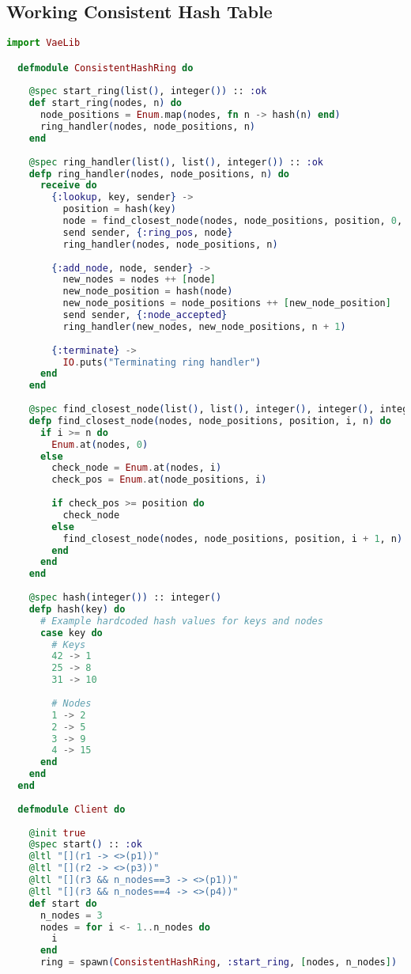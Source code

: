 \subsection{Working Consistent Hash Table}
\begin{lstlisting}[language=Elixir, xleftmargin=.1\linewidth]
  import VaeLib

  defmodule ConsistentHashRing do
  
    @spec start_ring(list(), integer()) :: :ok
    def start_ring(nodes, n) do
      node_positions = Enum.map(nodes, fn n -> hash(n) end)
      ring_handler(nodes, node_positions, n)
    end
  
    @spec ring_handler(list(), list(), integer()) :: :ok
    defp ring_handler(nodes, node_positions, n) do
      receive do
        {:lookup, key, sender} ->
          position = hash(key)
          node = find_closest_node(nodes, node_positions, position, 0, n)
          send sender, {:ring_pos, node}
          ring_handler(nodes, node_positions, n)
  
        {:add_node, node, sender} ->
          new_nodes = nodes ++ [node]
          new_node_position = hash(node)
          new_node_positions = node_positions ++ [new_node_position]
          send sender, {:node_accepted}
          ring_handler(new_nodes, new_node_positions, n + 1)
  
        {:terminate} ->
          IO.puts("Terminating ring handler")
      end
    end
  
    @spec find_closest_node(list(), list(), integer(), integer(), integer()) :: integer()
    defp find_closest_node(nodes, node_positions, position, i, n) do
      if i >= n do
        Enum.at(nodes, 0)
      else
        check_node = Enum.at(nodes, i)
        check_pos = Enum.at(node_positions, i)
  
        if check_pos >= position do
          check_node
        else
          find_closest_node(nodes, node_positions, position, i + 1, n)
        end
      end
    end
  
    @spec hash(integer()) :: integer()
    defp hash(key) do
      # Example hardcoded hash values for keys and nodes
      case key do
        # Keys
        42 -> 1
        25 -> 8
        31 -> 10
  
        # Nodes
        1 -> 2
        2 -> 5
        3 -> 9
        4 -> 15
      end
    end
  end
  
  defmodule Client do
  
    @init true
    @spec start() :: :ok
    @ltl "[](r1 -> <>(p1))"
    @ltl "[](r2 -> <>(p3))"
    @ltl "[](r3 && n_nodes==3 -> <>(p1))"
    @ltl "[](r3 && n_nodes==4 -> <>(p4))"
    def start do
      n_nodes = 3
      nodes = for i <- 1..n_nodes do
        i
      end
      ring = spawn(ConsistentHashRing, :start_ring, [nodes, n_nodes])
  

\end{lstlisting}

